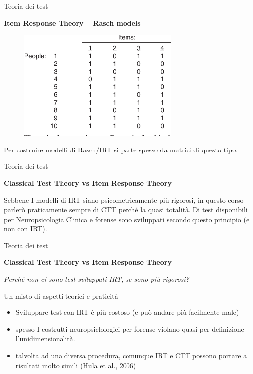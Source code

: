 \documentclass[
  ignorenonframetext,
]{beamer}
\providecommand{\tightlist}{%
  \setlength{\itemsep}{0pt}\setlength{\parskip}{0pt}}
\begin{document}
\begin{frame}{Teoria dei test}
\label{teoria-dei-test-6}
\begin{center}
  \textbf{Item Response Theory – Rasch models}
\end{center}

\begin{figure}
  \includegraphics[width=0.7\textwidth]{Figures/Rasch_matrix.png}
\end{figure}

Per costruire modelli di Rasch/IRT si parte spesso da matrici di questo
tipo.
\end{frame}

\begin{frame}{Teoria dei test}
\label{teoria-dei-test-7}
\begin{center}
  \textbf{Classical Test Theory vs Item Response Theory}
\end{center}
\vspace{2em}

Sebbene I modelli di IRT siano psicometricamente più rigorosi, in questo
corso parlerò praticamente sempre di CTT perché la quasi totalità. Di
test disponibili per Neuropsicologia Clinica e forense sono sviluppati
secondo questo principio (e non con IRT).
\end{frame}

\begin{frame}{Teoria dei test}
\label{teoria-dei-test-8}
\begin{center}
  \textbf{Classical Test Theory vs Item Response Theory}
\end{center}

\emph{Perché non ci sono test sviluppati IRT, se sono più rigorosi?}
\pause

Un misto di aspetti teorici e praticità \pause

\begin{itemize}[<+->]
\tightlist
\item
  Sviluppare test con IRT è più costoso (e può andare più facilmente
  male)
\item
  spesso I costrutti neuropsiclologici per forense violano quasi per
  definizione l'unidimensionalità.
\item
  talvolta ad una diversa procedura, comunque IRT e CTT possono portare
  a risultati molto simili
  (\href{https://doi.org/10.1044/1092-4388(2006/003)}{Hula et al.,
  2006})
\end{itemize}
\end{frame}
\end{document}
